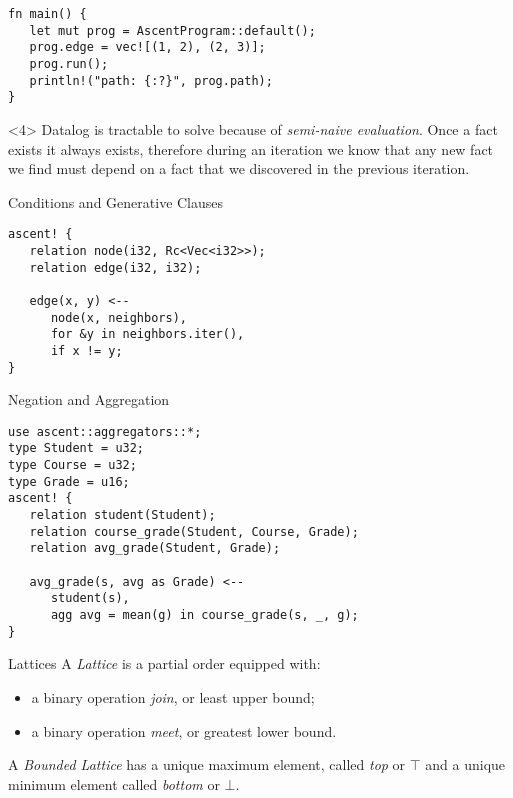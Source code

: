 \documentclass[presentation]{beamer}
\begin{document}
\begin{frame}
\begin{onlyenv}
\begin{verbatim}
fn main() {
   let mut prog = AscentProgram::default();
   prog.edge = vec![(1, 2), (2, 3)];
   prog.run();
   println!("path: {:?}", prog.path);
}
\end{verbatim}
\end{onlyenv}
\begin{onlyenv}<4>
Datalog is tractable to solve because of \emph{semi-naive evaluation}. Once a fact exists it always exists, therefore during an iteration we know that any new fact we find must depend on a fact that we discovered in the previous iteration.
\end{onlyenv}
\end{frame}
\begin{frame}[label={sec:org276e755},fragile]{Conditions and Generative Clauses}
 \begin{verbatim}
ascent! {
   relation node(i32, Rc<Vec<i32>>);
   relation edge(i32, i32);

   edge(x, y) <--
      node(x, neighbors),
      for &y in neighbors.iter(),
      if x != y;
}
\end{verbatim}
\end{frame}
\begin{frame}[label={sec:orge56f7f8},fragile]{Negation and Aggregation}
 \begin{verbatim}
use ascent::aggregators::*;
type Student = u32;
type Course = u32;
type Grade = u16;
ascent! {
   relation student(Student);
   relation course_grade(Student, Course, Grade);
   relation avg_grade(Student, Grade);

   avg_grade(s, avg as Grade) <--
      student(s),
      agg avg = mean(g) in course_grade(s, _, g);
}
\end{verbatim}
\end{frame}
\begin{frame}[label={sec:orgdd26c00}]{Lattices}
A \emph{Lattice} is a partial order equipped with:
\begin{itemize}
\item a binary operation \emph{join}, or least upper bound;
\item a binary operation \emph{meet}, or greatest lower bound.
\end{itemize}

A \emph{Bounded Lattice} has a unique maximum element, called \emph{top} or \(\top\) and a unique minimum element called \emph{bottom} or \(\bot\).
\end{frame}
\end{document}
